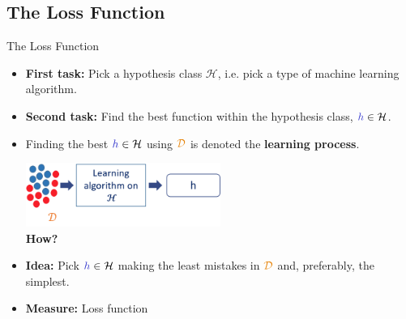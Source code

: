 \documentclass[aspectratio=169,10pt]{beamer}
\begin{document}
\subsection{The Loss Function}
\begin{frame}{The Loss Function}
	\begin{itemize}
		\item \textbf{First task:} Pick a hypothesis class $\mathcal{H}$, i.e. pick a type of machine learning algorithm.
		\pause
		\item \textbf{Second task:} Find the best function within the hypothesis class,  $\hypothesis \in \mathcal{H}$.
		\pause
		\item Finding the best $\hypothesis \in \mathcal{H}$ using $\trainset$ is denoted the \textbf{learning process}.
	\vspace{0.3cm}
		\begin{center} \includegraphics[width=0.5\textwidth, clip]{images/learning} \\
			\pause
		\large	\textbf{How?} 
		\end{center} 
		\vspace{0.3cm}
		\pause
		\item \textbf{Idea:} Pick $\hypothesis \in \mathcal{H}$ making the least mistakes in $\trainset$ and, preferably, the simplest.
		\pause
		\item \textbf{Measure:} Loss function
	\end{itemize}

		
\end{frame}
\end{document}
